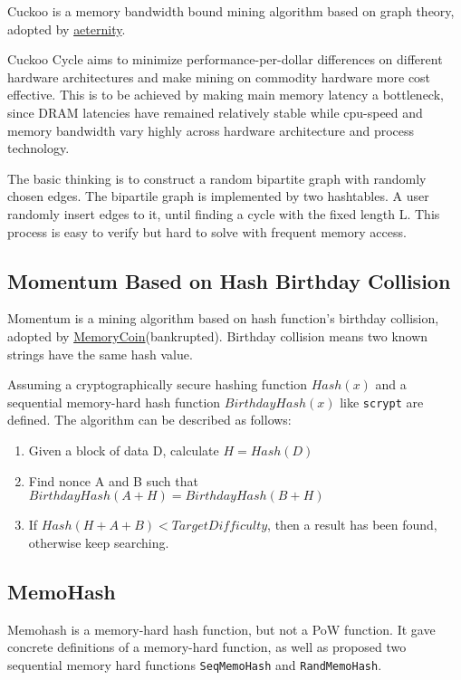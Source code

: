 \documentclass[11pt]{article}
\begin{document}
Cuckoo is a memory bandwidth bound mining algorithm based on graph theory\cite{tromp2014cuckoo}, adopted by  \href{https://aeternity.com/}{aeternity}.
 
Cuckoo Cycle aims to minimize performance-per-dollar differences on different hardware architectures and make mining on commodity hardware more cost effective. This is to be achieved by making main memory latency a bottleneck, since DRAM latencies have remained relatively stable while cpu-speed and memory bandwidth vary highly across hardware architecture and process technology. 

The basic thinking is to construct a random bipartite graph with randomly chosen edges. The bipartile graph is implemented by two hashtables. A user randomly insert edges to it, until finding a cycle with the fixed length L. This process is easy to verify but hard to solve with frequent memory access.

\subsection{Momentum Based on Hash Birthday Collision}

Momentum is a mining algorithm based on hash function's birthday collision, adopted by \href{hhttp://memorycoin.org/}{MemoryCoin}(bankrupted). Birthday collision means two known strings have the same hash value. 

Assuming a cryptographically secure hashing function $Hash(x)$ and a sequential memory-hard hash function $BirthdayHash(x)$ like \texttt{scrypt} are defined. The algorithm can be described as follows:

\begin{enumerate}
\item Given a block of data D, calculate $H=Hash(D)$
\item Find nonce A and B such that $BirthdayHash(A+H)=BirthdayHash(B+H)$
\item If $Hash(H+A+B)<TargetDifficulty$, then a result has been found, otherwise keep searching.
\end{enumerate}

\subsection{MemoHash}

Memohash\cite{memohash} is a memory-hard hash function, but not a PoW function. It gave concrete definitions of a memory-hard function, as well as proposed two sequential memory hard functions \texttt{SeqMemoHash} and \texttt{RandMemoHash}.
\end{document}

